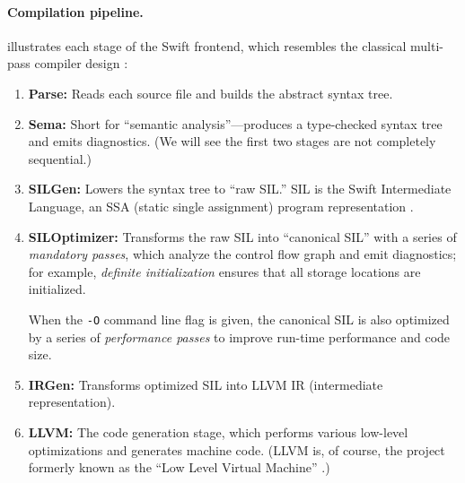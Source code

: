 \documentclass[../generics]{subfiles}
\begin{document}
\paragraph{Compilation pipeline.}
 illustrates each stage of the Swift frontend, which resembles the classical multi-pass compiler design \cite{muchnick1997advanced,cooper2004engineering}:
\begin{enumerate}
\item {}\textbf{Parse:} Reads each source file and builds the abstract syntax tree.
\item {}\textbf{Sema:} Short for ``semantic analysis''---produces a type-checked syntax tree and emits diagnostics. (We will see the first two stages are not completely sequential.)
\item {}\textbf{SILGen:} Lowers the syntax tree to ``raw SIL.'' SIL is the Swift Intermediate Language, an SSA (static single assignment) program representation \cite{sil,siltalk}.
\item {}\textbf{SILOptimizer:} Transforms the raw SIL into ``canonical SIL'' with a series of \emph{mandatory passes}, which analyze the control flow graph and emit diagnostics; for example, \emph{definite initialization} ensures that all storage locations are initialized.

When the \texttt{-O} command line flag is given, the canonical SIL is also optimized by a series of \emph{performance passes} to improve run-time performance and code size.
\item {}\textbf{IRGen:} Transforms optimized SIL into LLVM IR (intermediate representation).
\item {}\textbf{LLVM:} The code generation stage, which performs various low-level optimizations and generates machine code. (LLVM is, of course, the project formerly known as the ``Low Level Virtual Machine'' \cite{llvm}.)
\end{enumerate}
\end{document}
